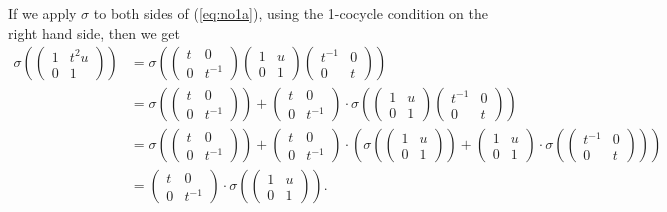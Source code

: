 	If we apply $\sigma$ to both sides of (\ref{eq:no1a}), using the 1-cocycle condition on the right hand side, then we get
	\begin{align*}
	\sigma\left(
			\left(\begin{matrix} 1 & t^2u \\ 0 & 1\end{matrix}\right)
			\right) &=
	\sigma\left(
			\left(\begin{matrix} t & 0 \\ 0 & t^{-1}  \end{matrix}\right) 
			\left(\begin{matrix} 1 & u \\ 0 & 1 \end{matrix}\right) 
			\left(\begin{matrix}  t^{-1} & 0 \\ 0 & t \end{matrix}\right)
			\right) 
	\\
		&=
	\sigma\left(
			\left(\begin{matrix} t & 0 \\ 0 & t^{-1}  \end{matrix}\right) 
			\right) +
	\left(\begin{matrix} t & 0 \\ 0 & t^{-1}  \end{matrix}\right) \cdot
	\sigma\left(
			\left(\begin{matrix} 1 & u \\ 0 & 1 \end{matrix}\right) 
			\left(\begin{matrix}  t^{-1} & 0 \\ 0 & t \end{matrix}\right)
			\right) 
	\\
		&= 
	\sigma\left(
			\left(\begin{matrix} t & 0 \\ 0 & t^{-1}  \end{matrix}\right) 
			\right) +
	\left(\begin{matrix} t & 0 \\ 0 & t^{-1}  \end{matrix}\right) \cdot
	\left(
			\sigma\left(
				\left(\begin{matrix} 1 & u \\ 0 & 1 \end{matrix}\right) 
				\right) +
			\left(\begin{matrix} 1 & u \\ 0 & 1 \end{matrix}\right) \cdot
			\sigma\left(
				\left(\begin{matrix}  t^{-1} & 0 \\ 0 & t \end{matrix}\right)
				\right)
			\right)
	\\
		&= 
		\left(\begin{matrix} t & 0 \\ 0 & t^{-1}  \end{matrix}\right) \cdot
	\sigma\left(
			\left(\begin{matrix} 1 & u \\ 0 & 1 \end{matrix}\right) 
			\right).
	\end{align*}

